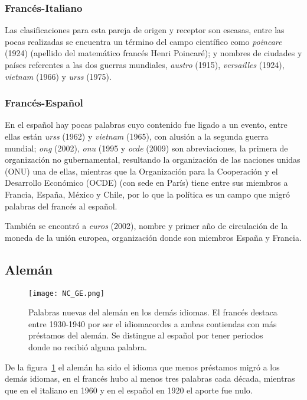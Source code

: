 \subsubsection*{Francés-Italiano}%

Las clasificaciones para esta pareja de origen y receptor son escasas, entre las pocas realizadas se encuentra un término del campo científico como \textit{poincare} (1924) (apellido del matemático francés Henri Poincaré);  y nombres de ciudades y países referentes a las dos guerras mundiales, \textit{austro} (1915), \textit{versailles} (1924), \textit{vietnam} (1966)  y \textit{urss} (1975).


\subsubsection*{Francés-Español}%

En el español hay pocas palabras cuyo contenido fue ligado a un evento, entre ellas están \textit{urss} (1962) y \textit{vietnam} (1965), con alusión a la segunda guerra mundial; \textit{ong} (2002), \textit{onu} (1995 y \textit{ocde} (2009) son abreviaciones,  la primera de organización no gubernamental,  resultando la organización de las naciones unidas (ONU)  una de ellas, mientras que  la Organización para la Cooperación y el Desarrollo Económico (OCDE) (con sede en París) tiene entre sus miembros a Francia, España, México y Chile, por lo que la política es un campo que migró palabras del francés al español. 

También se encontró a  \textit{euros} (2002), nombre y primer año de circulación de la moneda de la unión europea, organización donde son miembros España y Francia. 




\subsection{Alemán}%

\begin{figure}[h!]
	\centering
	\texttt{[image: NC\_GE.png]}
	\caption{Palabras nuevas del alemán en los demás idiomas. El francés destaca  entre 1930-1940 por ser el idiomacordes a ambas contiendas con más préstamos del alemán. Se distingue al español por tener periodos donde no recibió alguna palabra.}  
	\label{fig.NC_GE}
\end{figure}


De la figura~\ref{fig.NC_GE} el alemán ha sido el idioma que menos préstamos migró a los demás idiomas, en el francés  hubo al menos tres  palabras cada década, mientras que en el italiano  en 1960 y  en el español en 1920 el aporte fue nulo. 

